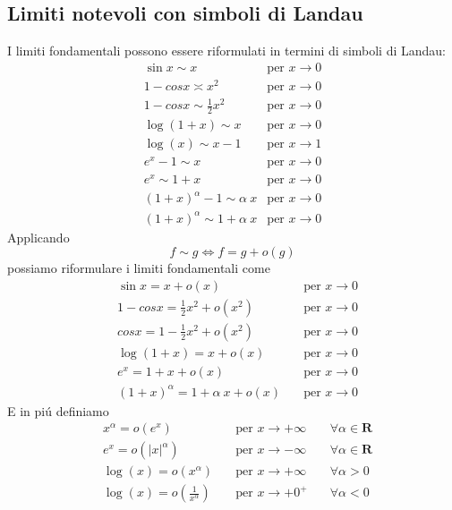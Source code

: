 \documentclass{book}
\begin{document}
\begin{proposition}
  \subsection{Limiti notevoli con simboli di Landau}
  I limiti fondamentali possono essere riformulati in termini di simboli di Landau:
  \begin{align*}
     & \sin x \sim x \quad               & \text{per } x \to 0 & \\
     & 1 - cosx \asymp x^2 \quad         & \text{per } x \to 0 & \\
     & 1-cosx \sim \frac{1}{2} x^2 \quad & \text{per } x \to 0 & \\
     & \log(1+x) \sim x \quad            & \text{per } x \to 0 & \\
     & \log(x) \sim x-1 \quad            & \text{per } x \to 1 & \\
     & e^x - 1 \sim x \quad              & \text{per } x \to 0 & \\
     & e^x \sim 1 + x \quad              & \text{per } x \to 0 & \\
     & (1+x)^\alpha - 1 \sim \alpha\ x   & \text{per } x \to 0 & \\
     & (1+x)^\alpha \sim 1 + \alpha\ x   & \text{per } x \to 0 &
  \end{align*}
  Applicando
  \[ f \sim g \iff f = g + o(g)\]
  possiamo riformulare i limiti fondamentali come
  \begin{align*}
     & \sin x        = x + o(x) \quad                 & \text{per } x \to 0 \\
     & 1 - cosx      = \frac{1}{2} x^2 + o(x^2) \quad & \text{per } x \to 0 \\
     & cosx      = 1 - \frac{1}{2} x^2 + o(x^2) \quad & \text{per } x \to 0 \\
     & \log(1+x)     = x + o(x) \quad                 & \text{per } x \to 0 \\
     & e^x            = 1 + x + o(x) \quad            & \text{per } x \to 0 \\
     & (1+x)^\alpha  = 1 + \alpha\ x + o(x) \quad     & \text{per } x \to 0
  \end{align*}
  E in pi\'u definiamo
  \begin{align}
     & x^\alpha = o(e^x) \quad                        & \text{per } x \to +\infty & \quad\forall \alpha \in \mathbf{R} \\
     & e^x=o(|x|^\alpha) \quad                        & \text{per } x \to -\infty & \quad\forall \alpha \in \mathbf{R} \\
     & \log(x)=o(x^\alpha) \quad                      & \text{per } x \to +\infty & \quad\forall \alpha > 0            \\
     & \log(x)=o\left(\frac{1}{x^\alpha}\right) \quad & \text{per } x \to +0^+    & \quad\forall \alpha < 0
  \end{align}
\end{proposition}
\end{document}
